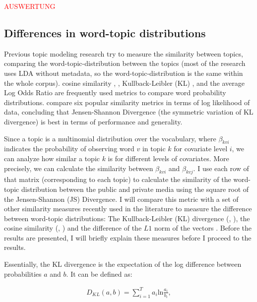 \documentclass[12pt,a4paper,notitlepage]{article}
\begin{document}
\textcolor{red}{AUSWERTUNG}

\subsection{Differences in word-topic distributions}\label{ch_similarity}

Previous topic modeling research try to measure the similarity between topics, comparing the word-topic-distribution between the topics (most of the research uses LDA without metadata, so the word-topic-distribution is the same within the whole corpus). cosine similarity \citep{he_detecting_2009}, \citep{ramage_labeled_2009}, Kullback-Leibler (KL) \citep{newman_distributed_2009}, \citep{wang_mining_2009} and the average Log Odds Ratio \citep{chaney_visualizing_2012} are frequently used metrics to compare word probability distributions. \citet{kim_topic_2011} compare six popular similarity metrics in terms of log likelihood of data, concluding that Jensen-Shannon Divergence (the symmetric variation of KL divergence) is best in terms of performance and generality. 

Since a topic is a multinomial distribution over the vocabulary, where $\beta_{kvi}$ indicates the probability of observing word $v$ in topic $k$ for covariate level $i$, we can analyze how similar a topic $k$ is for different levels of covariates. More precisely, we can calculate the similarity between $\beta_{kvi}$ and $\beta_{kvj}$. I use each row of that matrix (corresponding to each topic) to calculate the similarity of the word-topic distribution between the public and private media using the square root of the Jensen-Shannon (JS) Divergence. I will compare this metric with a set of other similarity measures recently used in the literature to measure the difference between word-topic distributions: The Kullback-Leibler (KL) divergence (\citet{newman_distributed_2009}, \citet{wang_mining_2009}), the cosine similarity (\citet{he_detecting_2009}, \citet{ramage_labeled_2009}) and the difference of the $L1$ norm of the vectors \citep{roberts_navigating_2016}. Before the results are presented, I will briefly explain these measures before I proceed to the results.

Essentially, the KL divergence is the expectation of the log difference between probabilities $a$ and $b$. It can be defined as:

\begin{align*}
	D_{KL}(a,b)=\sum_{i=1}^T a_i \text{ln} \frac{a_i}{b_i},
\end{align*}
\end{document}
